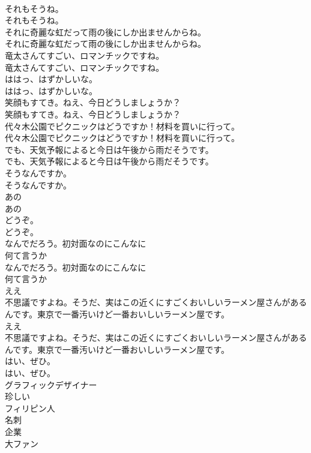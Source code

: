 \documentclass[8pt]{extreport}
\begin{document}
\begin{CJK}{UTF8}{min}
\\	それもそうね。	
\\	それもそうね。 
\\	それに奇麗な虹だって雨の後にしか出ませんからね。	
\\	それに奇麗な虹だって雨の後にしか出ませんからね。 
\\	竜太さんてすごい、ロマンチックですね。	
\\	竜太さんてすごい、ロマンチックですね。 
\\	ははっ、はずかしいな。	
\\	ははっ、はずかしいな。 
\\	笑顔もすてき。ねえ、今日どうしましょうか？	
\\	笑顔もすてき。ねえ、今日どうしましょうか？ 
\\	代々木公園でピクニックはどうですか！材料を買いに行って。	
\\	代々木公園でピクニックはどうですか！材料を買いに行って。 
\\	でも、天気予報によると今日は午後から雨だそうです。	
\\	でも、天気予報によると今日は午後から雨だそうです。 
\\	そうなんですか。	
\\	そうなんですか。 
\\	あの
\\	あの
\\	どうぞ。	
\\	どうぞ。 
\\	なんでだろう。初対面なのにこんなに
\\	何て言うか
\\	なんでだろう。初対面なのにこんなに
\\	何て言うか
\\	ええ
\\	不思議ですよね。そうだ、実はこの近くにすごくおいしいラーメン屋さんがあるんです。東京で一番汚いけど一番おいしいラーメン屋です。	
\\	ええ
\\	不思議ですよね。そうだ、実はこの近くにすごくおいしいラーメン屋さんがあるんです。東京で一番汚いけど一番おいしいラーメン屋です。 
\\	はい、ぜひ。	
\\	はい、ぜひ。 
\\	グラフィックデザイナー
\\	珍しい
\\	フィリピン人
\\	名刺
\\	企業
\\	大ファン

\end{CJK}
\end{document}
